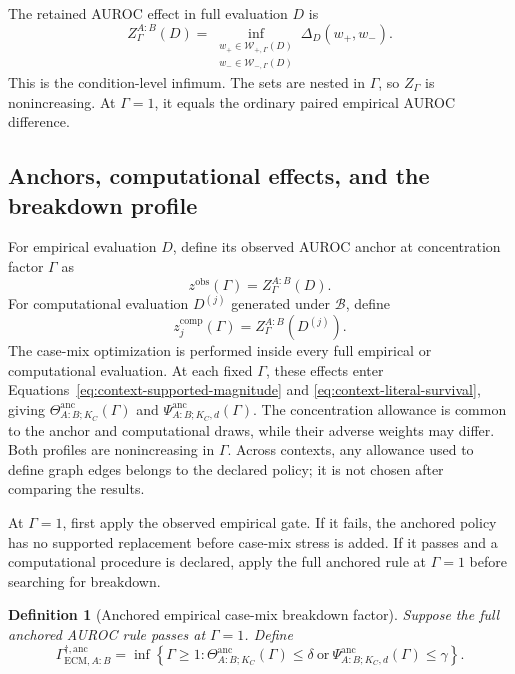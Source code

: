 \documentclass[11pt]{article}
\newcommand{\Boot}{\mathcal{B}}
\newcommand{\Psianc}{\Psi^{\mathrm{anc}}}
\newcommand{\Thetaanc}{\Theta^{\mathrm{anc}}}
\newtheorem{definition}{Definition}
\theoremstyle{remark}
\begin{document}
The retained AUROC effect in full evaluation $D$ is
\begin{equation}
Z_\Gamma^{A:B}(D)
=
\inf_{\substack{
w_+\in\mathcal W_{+,\Gamma}(D)\\
w_-\in\mathcal W_{-,\Gamma}(D)}}
\Delta_D(w_+,w_-).
\label{eq:auroc-retained}
\end{equation}
This is the condition-level infimum. The sets are nested in $\Gamma$, so
$Z_\Gamma$ is nonincreasing. At $\Gamma=1$, it equals the ordinary paired
empirical AUROC difference.

\subsection{Anchors, computational effects, and the breakdown profile}

For empirical evaluation $D$, define its observed AUROC anchor at
concentration factor $\Gamma$ as
\[
z^{\mathrm{obs}}(\Gamma)
=Z_\Gamma^{A:B}(D).
\]
For computational evaluation $D^{(j)}$ generated under $\Boot$, define
\[
z_j^{\mathrm{comp}}(\Gamma)
=Z_\Gamma^{A:B}(D^{(j)}).
\]
The case-mix optimization is performed inside every full empirical or
computational evaluation. At each fixed $\Gamma$, these effects enter
Equations~\eqref{eq:context-supported-magnitude} and
\eqref{eq:context-literal-survival}, giving
$\Thetaanc_{A:B;K_C}(\Gamma)$ and
$\Psianc_{A:B;K_C,d}(\Gamma)$.
The concentration allowance is common to the anchor and computational draws,
while their adverse weights may differ. Both profiles are nonincreasing in
$\Gamma$. Across contexts, any allowance used to define graph edges belongs
to the declared policy; it is not chosen after comparing the results.

At $\Gamma=1$, first apply the observed empirical gate. If it fails, the
anchored policy has no supported replacement before case-mix stress is added.
If it passes and a computational procedure is declared, apply the full
anchored rule at $\Gamma=1$ before searching for breakdown.

\begin{definition}[Anchored empirical case-mix breakdown factor]
Suppose the full anchored AUROC rule passes at $\Gamma=1$. Define
\begin{equation}
\Gamma_{\mathrm{ECM},A:B}^{\dagger,\mathrm{anc}}
=
\inf\left\{\Gamma\geq1:
\Thetaanc_{A:B;K_C}(\Gamma)\leq\delta
\ \text{or}\ 
\Psianc_{A:B;K_C,d}(\Gamma)\leq\gamma
\right\}.
\label{eq:anchored-breakdown}
\end{equation}
\end{definition}
\end{document}

